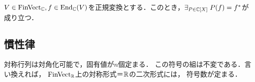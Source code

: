 \documentclass[uplatex,dvipdfmx]{jsreport}
\begin{document}
\begin{lemma}[随伴は多項式変換である]
    $V\in\mathrm{FinVect}_{\mathbb{C}},f\in\mathrm{End}_{\mathbb{C}}(V)$を正規変換とする．このとき，$\exists_{P\in\mathbb{C}[X]}\;P(f)=f^*$が成り立つ．
\end{lemma}


\subsection{慣性律}

\begin{tcolorbox}[colframe=ForestGreen, colback=ForestGreen!10!white, breakable]
    対称行列は対角化可能で，固有値が$n$個定まる．
    この符号の組は不変である．言い換えれば，
    $\mathrm{FinVect}_{\mathbb{R}}$上の対称形式＝$\mathbb{R}$の二次形式には，
    符号数が定まる．
\end{tcolorbox}
\end{document}
